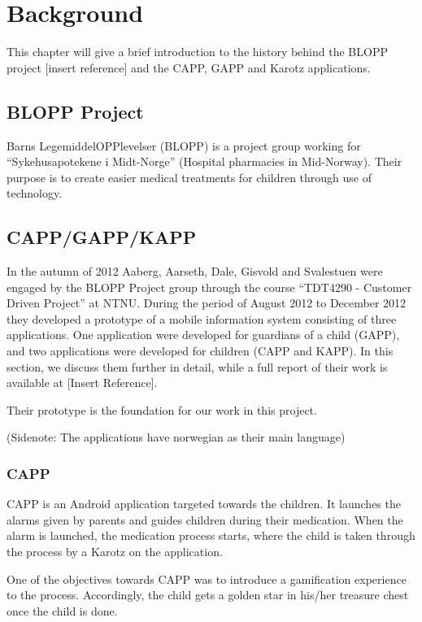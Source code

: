 \chapter{Background}
\label{chp:background}


This chapter will give a brief introduction to the history behind the BLOPP project [insert reference] and the CAPP, GAPP and Karotz applications.


\section{BLOPP Project}
\label{sec:bloppproject}
Barns LegemiddelOPPlevelser (BLOPP) is a project group working for ``Sykehusapotekene i Midt-Norge'' (Hospital pharmacies in Mid-Norway). Their purpose is to create easier medical treatments for children through use of technology.   


\section{CAPP/GAPP/KAPP}
\label{sec:cappgappkapp}
In the autumn of 2012 Aaberg, Aarseth, Dale, Gisvold and Svalestuen were engaged by the BLOPP Project group through the course ``TDT4290 - Customer Driven Project'' \cite{customerdrivenntnu} at NTNU. During the period of August 2012 to December 2012 they developed a prototype of a mobile information system consisting of three applications. One application were developed for guardians of a child (GAPP), and two applications were developed for children (CAPP and KAPP). In this section, we discuss them further in detail, while a full report of their work is available at [Insert Reference].

Their prototype is the foundation for our work in this project.

(Sidenote: The applications have norwegian as their main language) %

\subsection{CAPP}
CAPP is an Android application targeted towards the children. It launches the alarms given by parents and guides children during their medication. When the alarm is launched, the medication process starts, where the child is taken through the process by a Karotz on the application. 


One of the objectives towards CAPP was to introduce a gamification experience to the process. Accordingly, the child gets a golden star in his/her treasure chest once the child is done.

